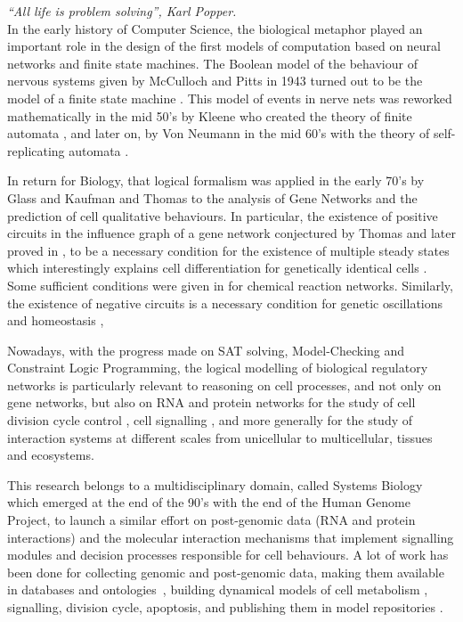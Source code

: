 \documentclass[graybox]{svmult}
\begin{document}
\hfill\emph{``All life is problem solving'', Karl Popper.}\\

In the early history of Computer Science, the biological metaphor played an important role
in the design of the first models of computation based on neural networks and finite state machines.
The Boolean model of the behaviour of nervous systems given by McCulloch and Pitts in 1943
turned out to be the model of a finite state machine \cite{MP43bmb}.
This model of events in nerve nets was reworked mathematically in the mid 50's by Kleene who created the theory of finite automata \cite{Kleene56automata},
and later on, by Von Neumann in the mid 60's with the theory of self-replicating automata \cite{VonNeumann66book}.

In return for Biology, that logical formalism was applied in the early 70's 
by Glass and Kaufman \cite{GK73jtb} and Thomas \cite{Thomas73jtb,Thomas81sss,TA90book,Thomas91jtb} to the analysis of Gene Networks
and the prediction of cell qualitative behaviours.
In particular, the existence of positive circuits in the influence graph of a gene network conjectured by Thomas and later proved in \cite{RRT08aam,Ruet16mfcs,Soule03complexus},
to be a necessary condition for the existence of multiple steady states
which interestingly explains cell differentiation for genetically identical cells \cite{TK01chaos,NCCT10pcb,SCT08ijdb}.
Some sufficient conditions  were given in \cite{Feinberg77crt} for chemical reaction networks.
Similarly, the existence of negative circuits is a necessary condition for genetic oscillations and homeostasis \cite{Snoussi98jbs},

Nowadays, with the progress made on SAT solving, Model-Checking and Constraint Logic Programming,
the logical modelling of biological regulatory networks is particularly relevant to reasoning on cell processes, %
and not only on gene networks,
but also on RNA and protein networks for the study of cell division cycle control \cite{FT09mb,TFFT16bi}, cell signalling \cite{GCBRKT13plos}, 
and more generally for the study of interaction systems at different scales from unicellular to multicellular, tissues and ecosystems.

This research belongs to a multidisciplinary domain, called Systems Biology~\cite{IGH01arghg} which emerged at the end of the 90's with the end of the Human Genome Project,
to launch a similar effort on post-genomic data (RNA and protein interactions)
and the molecular interaction mechanisms that implement signalling modules and decision processes responsible for cell behaviours.
A lot of work has been done for collecting genomic and post-genomic data, making them available in databases and ontologies~\cite{go00ng,KG00nar},
building dynamical models of cell metabolism \cite{Herrgard08nbt}, signalling, division cycle, apoptosis, and publishing them in model repositories \cite{NBBCDDLSSSSH06nar}.
\end{document}
